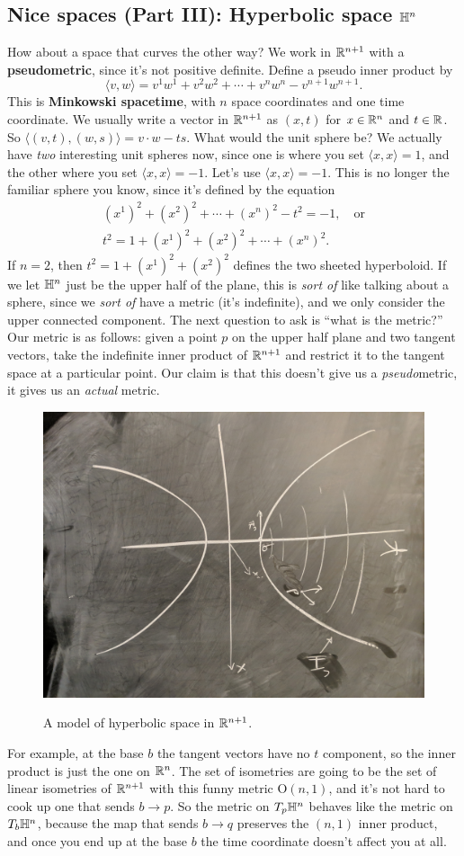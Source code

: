 \subsection{Nice spaces (Part III): Hyperbolic space $\mathbb{H}^n $}
How about a space that curves the other way? We work in $\mathbb{R}^{n+1}$ with a \textbf{pseudometric}, since it's not positive definite. Define a pseudo inner product by \[
\langle v,w \rangle =v^1w^1+v^2w^2+\cdots +v^n w^n -v^{n+1}w^{n+1}.
\] This is \textbf{Minkowski spacetime}, with $n$ space coordinates and one time coordinate. We usually write a vector in $\mathbb{R}^{n+1}$ as $(x,t)$ for $x \in \mathbb{R}^n $ and $t \in \mathbb{R}$. So $\langle (v,t),(w,s) \rangle =v\cdot w-ts$. What would the unit sphere be? We actually have \emph{two} interesting unit spheres now, since one is where you set $\langle x,x \rangle =1$, and the other where you set $\langle x,x \rangle=-1$. Let's use $\langle x,x \rangle =-1$. This is no longer the familiar sphere you know, since it's defined by the equation 
\begin{gather*}
(x^1)^2+(x^2)^2+\cdots + (x^n )^2-t^2=-1, \quad \text{or} \\
t^2=1+(x^1)^2+(x^2)^2+\cdots +(x^n )^2.
\end{gather*} If $n=2$, then $t^2=1+(x^1)^2+(x^2)^2$ defines the two sheeted hyperboloid. If we let $\mathbb{H}^n $ just be the upper half of the plane, this is \emph{sort of} like talking about a sphere, since we \emph{sort of} have a metric (it's indefinite), and we only consider the upper connected component. The next question to ask is ``what is the metric?'' Our metric is as follows: given a point $p$ on the upper half plane and two tangent vectors, take the indefinite inner product of $\mathbb{R}^{n+1}$ and restrict it to the tangent space at a particular point. Our claim is that this doesn't give us a \emph{pseudo}metric, it gives us an \emph{actual} metric.

\begin{figure}[H]
\centering
\includegraphics[width=0.3\linewidth]{figures/rgeo_lec5.1.jpg}
\label{hyp} 
\caption{A model of hyperbolic space in $\mathbb{R}^{n+1}$.} 
\end{figure}

For example, at the base $b$ the tangent vectors have no $t$ component, so the inner product is just the one on $\mathbb{R}^n $. The set of isometries are going to be the set of linear isometries of $\mathbb{R}^{n+1}$ with this funny metric $\mathrm O(n,1)$, and it's not hard to cook up one that sends $b\to p$. So the metric on $T_p\mathbb{H}^n $ behaves like the metric on $T_b \mathbb{H}^n $, because the map that sends $b\to q$ preserves the $(n,1)$ inner product, and once you end up at the base $b$ the time coordinate doesn't affect you at all.

